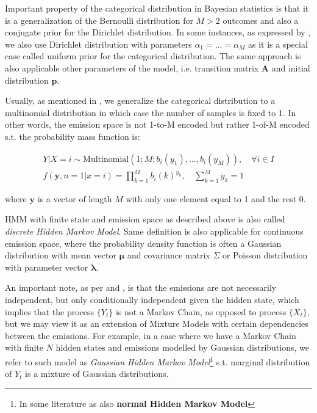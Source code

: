Important property of the categorical distribution in Bayesian statistics is that it is a generalization of the Bernoulli distribution for $M > 2$ 
outcomes and also a conjugate prior for the Dirichlet distribution. In some instances, as expressed by \citep{Paisley2009}, we also use Dirichlet distribution with parameters $\alpha_1=\ldots=\alpha_M$ 
as it is a special case called uniform prior for the categorical distribution. The same approach is also applicable other parameters of the model, i.e. 
transition matrix $\textbf{A}$ and initial distribution $\textbf{p}$.

Usually, as mentioned in \citep{Agresti2007}, we generalize the categorical distribution to a multinomial distribution in which case the number of samples is fixed to 1. 
In other words, the emission space is not 1-to-M encoded but rather 1-of-M encoded s.t. the probability mass function is:

\begin{gather}
    Y | X = i \sim \text{Multinomial}(1;M;b_i(y_1),\ldots,b_i(y_M)), \quad \forall i \in I \\
    f(\textbf{y},n=1|x=i) = \prod_{k=1}^M b_i(k)^{y_{k}}, \quad \sum_{k=1}^M y_{k} = 1
\end{gather}

\noindent where $\textbf{y}$ is a vector of length $M$ with only one element equal to 1 and the rest 0. 

HMM with finite state and emission space as described above is also called \textit{discrete Hidden Markov Model}. Same definition is also applicable for continuous emission space, where the probability density function is 
often a Gaussian distribution with mean vector $\mathbf{\mu}$ and covariance matrix $\Sigma$ or Poisson distribution with parameter vector $\boldsymbol{\lambda}$.

An important note, as per \citep{Bishop2006} and \citep{Ramaprasad2004}, is that the emissions are not necessarily independent, but only conditionally independent given the hidden state, which implies that the process $\{Y_t\}$ is not a Markov Chain, as opposed to process $\{X_t\}$,
but we may view it as an extension of Mixture Models with certain dependencies between the emissions. For example, in a case where we have a Markov Chain with finite $N$ hidden states and emissions modelled by Gaussian distributions, 
we refer to such model as \textit{Gaussian Hidden Markov Model}\footnote{In some literature as \citep{Capp2005} also \textbf{normal Hidden Markov Model}} s.t. marginal distribution of $Y_t$ is a mixture of Gaussian distributions.

